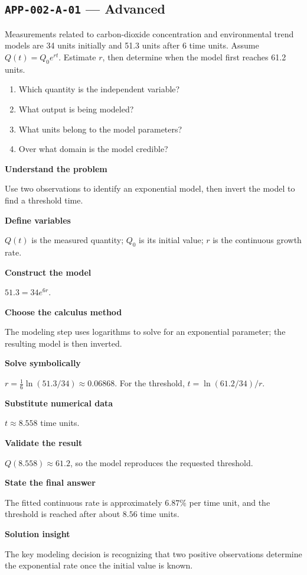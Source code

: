 \documentclass[11pt]{book}
\newcommand{\pid}[1]{\texttt{#1}}
\begin{document}
\subsection*{\pid{APP-002-A-01} — Advanced}
\begin{problembox}
Measurements related to carbon-dioxide concentration and environmental trend models are 34 units initially and 51.3 units after 6 time units. Assume $Q(t)=Q_0e^{rt}$. Estimate $r$, then determine when the model first reaches 61.2 units.
\end{problembox}
\begin{promptbox}\begin{enumerate}
\item Which quantity is the independent variable?
\item What output is being modeled?
\item What units belong to the model parameters?
\item Over what domain is the model credible?
\end{enumerate}\end{promptbox}
\begin{solutionbox}
\textbf{Understand the problem}\par Use two observations to identify an exponential model, then invert the model to find a threshold time.\par\medskip
\textbf{Define variables}\par $Q(t)$ is the measured quantity; $Q_0$ is its initial value; $r$ is the continuous growth rate.\par\medskip
\textbf{Construct the model}\par $51.3=34e^{6r}$.\par\medskip
\textbf{Choose the calculus method}\par The modeling step uses logarithms to solve for an exponential parameter; the resulting model is then inverted.\par\medskip
\textbf{Solve symbolically}\par $r=\frac1{6}\ln(51.3/34)\approx 0.06868$. For the threshold, $t=\ln(61.2/34)/r$.\par\medskip
\textbf{Substitute numerical data}\par $t\approx 8.558$ time units.\par\medskip
\textbf{Validate the result}\par $Q(8.558)\approx 61.2$, so the model reproduces the requested threshold.\par\medskip
\textbf{State the final answer}\par The fitted continuous rate is approximately $6.87\%$ per time unit, and the threshold is reached after about $8.56$ time units.\par\medskip
\textbf{Solution insight}\par The key modeling decision is recognizing that two positive observations determine the exponential rate once the initial value is known.\par\medskip
\end{solutionbox}
\end{document}
